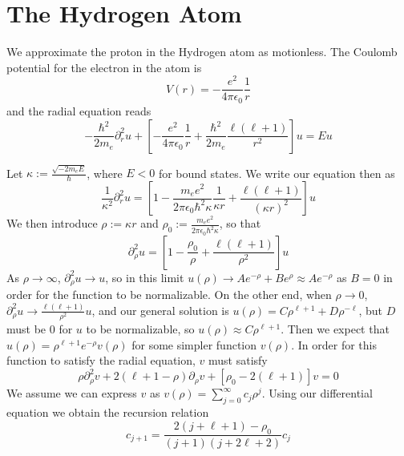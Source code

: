 \documentclass[12pt, a4paper, oneside, openright, titlepage]{book}
\begin{document}
\section{The Hydrogen Atom}

We approximate the proton in the Hydrogen atom as motionless. The Coulomb potential for the electron in the atom is \begin{equation*}
    V(r) = -\frac{e^2}{4\pi \epsilon_0}\frac{1}{r}
\end{equation*}
and the radial equation reads \begin{equation*}
    -\frac{\hbar^2}{2m_e}\partial_r^2u + \left[-\frac{e^2}{4\pi\epsilon_0}\frac{1}{r}+\frac{\hbar^2}{2m_e}\frac{\ell(\ell+1)}{r^2}\right]u = Eu
\end{equation*}


Let $\kappa := \frac{\sqrt{-2m_eE}}{\hbar}$, where $E < 0$ for bound states. We write our equation then as \begin{equation*}
    \frac{1}{\kappa^2}\partial_r^2u = \left[1-\frac{m_ee^2}{2\pi\epsilon_0\hbar^2\kappa}\frac{1}{\kappa r}+\frac{\ell(\ell+1)}{(\kappa r)^2}\right]u
\end{equation*}
We then introduce $\rho := \kappa r$ and $\rho_0 := \frac{m_ee^2}{2\pi\epsilon_0\hbar^2\kappa}$, so that \begin{equation*}
    \partial_{\rho}^2u = \left[1-\frac{\rho_0}{\rho}+\frac{\ell(\ell+1)}{\rho^2}\right]u
\end{equation*}
As $\rho\rightarrow \infty$, $\partial_{\rho}^2u \rightarrow u$, so in this limit $u(\rho) \rightarrow Ae^{-\rho}+Be^{\rho} \approx Ae^{-\rho}$ as $B = 0$ in order for the function to be normalizable. On the other end, when $\rho\rightarrow 0$, $\partial_{\rho}^2u\rightarrow \frac{\ell(\ell+1)}{\rho^2}u$, and our general solution is $u(\rho) = C\rho^{\ell+1}+D\rho^{-\ell}$, but $D$ must be $0$ for $u$ to be normalizable, so $u(\rho) \approx C\rho^{\ell+1}$. Then we expect that $u(\rho) = \rho^{\ell+1}e^{-\rho}v(\rho)$ for some simpler function $v(\rho)$. In order for this function to satisfy the radial equation, $v$ must satisfy \begin{equation*}
    \rho\partial_{\rho}^2v + 2(\ell+1-\rho)\partial_{\rho}v + [\rho_0-2(\ell+1)]v = 0
\end{equation*}
We assume we can express $v$ as $v(\rho) = \sum_{j=0}^{\infty}c_j\rho^j$. Using our differential equation we obtain the recursion relation \begin{equation*}
    c_{j+1} = \frac{2(j+\ell+1)-\rho_0}{(j+1)(j+2\ell+2)}c_j
\end{equation*}
\end{document}
